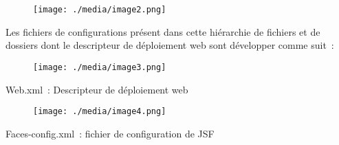 \documentclass[12pt]{article}
\begin{document}

\begin{figure}[H]
	\begin{Center}
		\texttt{[image: ./media/image2.png]}
	\end{Center}
\end{figure}



\par

Les fichiers de configurations présent dans cette hiérarchie de fichiers et de dossiers dont le descripteur de déploiement web sont développer comme suit : \par




\begin{figure}[H]
	\begin{Center}
		\texttt{[image: ./media/image3.png]}
	\end{Center}
\end{figure}



\par

\begin{Center}
Web.xml : Descripteur de déploiement web
\end{Center}\par




\begin{figure}[H]
	\begin{Center}
		\texttt{[image: ./media/image4.png]}
	\end{Center}
\end{figure}



\par

\begin{Center}
Faces-config.xml : fichier de configuration de JSF
\end{Center}\par
\end{document}
